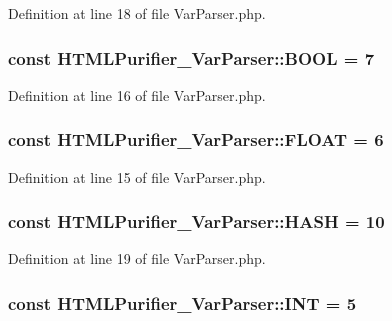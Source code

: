 Definition at line 18 of file Var\+Parser.\+php.

\hypertarget{classHTMLPurifier__VarParser_ae303e5d8799852e4fdc1bd99603532cf}{
\subsubsection[{B\+O\+O\+L}]{\setlength{\rightskip}{0pt plus 5cm}const H\+T\+M\+L\+Purifier\+\_\+\+Var\+Parser\+::\+B\+O\+O\+L = 7}}\label{classHTMLPurifier__VarParser_ae303e5d8799852e4fdc1bd99603532cf}


Definition at line 16 of file Var\+Parser.\+php.

\hypertarget{classHTMLPurifier__VarParser_a92917219071eaffb66dd1b71da0c702e}{
\subsubsection[{F\+L\+O\+A\+T}]{\setlength{\rightskip}{0pt plus 5cm}const H\+T\+M\+L\+Purifier\+\_\+\+Var\+Parser\+::\+F\+L\+O\+A\+T = 6}}\label{classHTMLPurifier__VarParser_a92917219071eaffb66dd1b71da0c702e}


Definition at line 15 of file Var\+Parser.\+php.

\hypertarget{classHTMLPurifier__VarParser_a525320233f95a8935ef20a228f5e02ea}{
\subsubsection[{H\+A\+S\+H}]{\setlength{\rightskip}{0pt plus 5cm}const H\+T\+M\+L\+Purifier\+\_\+\+Var\+Parser\+::\+H\+A\+S\+H = 10}}\label{classHTMLPurifier__VarParser_a525320233f95a8935ef20a228f5e02ea}


Definition at line 19 of file Var\+Parser.\+php.

\hypertarget{classHTMLPurifier__VarParser_af33c9523cd91827a7b94e938df336233}{
\subsubsection[{I\+N\+T}]{\setlength{\rightskip}{0pt plus 5cm}const H\+T\+M\+L\+Purifier\+\_\+\+Var\+Parser\+::\+I\+N\+T = 5}}\label{classHTMLPurifier__VarParser_af33c9523cd91827a7b94e938df336233}


